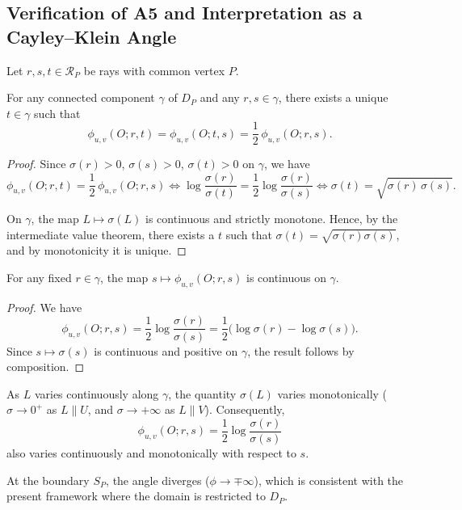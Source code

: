 \documentclass[12pt]{article}
\begin{document}
\subsection{Verification of A5 and Interpretation as a Cayley--Klein Angle}

Let $r,s,t\in\mathcal R_P$ be rays with common vertex $P$.

\begin{lemma}
For any connected component $\gamma$ of $D_P$ and any $r,s\in \gamma$,
there exists a unique $t\in \gamma$ such that
\[
\phi_{u,v}(O;r,t)=\phi_{u,v}(O;t,s)=\frac{1}{2}\,\phi_{u,v}(O;r,s).
\]
\end{lemma}

\begin{proof}
Since $\sigma(r)>0$,  $\sigma(s)>0$,  $\sigma(t)>0$ on $\gamma$, we have
\[
\phi_{u,v}(O;r,t)=\frac{1}{2}\,\phi_{u,v}(O;r,s)
\iff
\log\!\frac{\sigma(r)}{\sigma(t)}
=\frac{1}{2}\log\!\frac{\sigma(r)}{\sigma(s)}
\iff
\sigma(t)=\sqrt{\sigma(r)\,\sigma(s)}.
\]

On $\gamma$, the map $L\mapsto\sigma(L)$ is continuous and strictly monotone.
Hence, by the intermediate value theorem,
there exists a $t$ such that $\sigma(t)=\sqrt{\sigma(r)\sigma(s)}$,
and by monotonicity it is unique.
\end{proof}


\begin{lemma}[A5(ii): continuity]
For any fixed $r\in\gamma$, the map $s\mapsto\phi_{u,v}(O;r,s)$
is continuous on $\gamma$.
\end{lemma}

\begin{proof}
We have
\[
\phi_{u,v}(O;r,s)
=
\frac{1}{2}\log\frac{\sigma(r)}{\sigma(s)}
=
\frac{1}{2}\bigl(\log\sigma(r)-\log\sigma(s)\bigr).
\]
Since $s\mapsto\sigma(s)$ is continuous and positive on $\gamma$,
the result follows by composition.
\end{proof}


\begin{remark}
As $L$ varies continuously along $\gamma$,
the quantity $\sigma(L)$ varies monotonically
($\sigma\to 0^+$ as $L\parallel U$,
and $\sigma\to +\infty$ as $L\parallel V$).
Consequently,
\[
\phi_{u,v}(O;r,s)=\frac{1}{2}\log\frac{\sigma(r)}{\sigma(s)}
\]
also varies continuously and monotonically with respect to $s$.

At the boundary $S_P$, the angle diverges
($\phi\to \mp\infty$),
which is consistent with the present framework
where the domain is restricted to $D_P$.
\end{remark}
\end{document}
